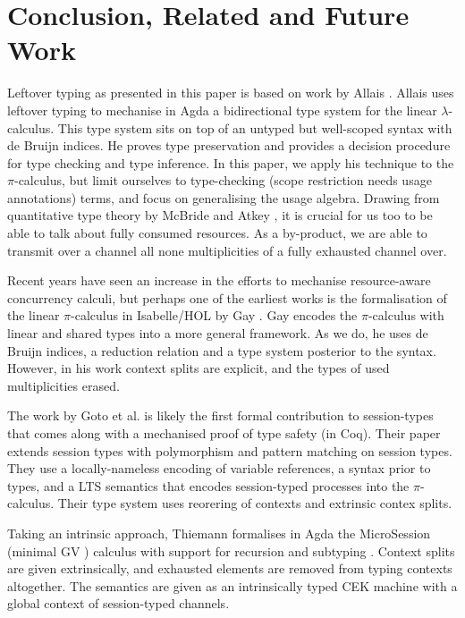 \documentclass[a4paper,UKenglish,cleveref,autoref,thm-restate,authorcolumns]{lipics-v2019}
\theoremstyle{definition}
\newcommand{\lambdacalc}{$\lambda$-calculus}
\newcommand{\picalc}{$\pi$-calculus}
\begin{document}
\section{Conclusion, Related and Future Work}

Leftover typing as presented in this paper is based on work by Allais \cite{Allais2018a}.
Allais uses leftover typing to mechanise in Agda a bidirectional type system for the linear \lambdacalc{}.
This type system sits on top of an untyped but well-scoped syntax with de Bruijn indices.
He proves type preservation and provides a decision procedure for type checking and type inference.
In this paper, we apply his technique to the \picalc{}, but limit ourselves to type-checking (scope restriction needs usage annotations) terms, and focus on generalising the usage algebra.
Drawing from quantitative type theory by McBride and Atkey \cite{McBride2016, Atkey2018}, it is crucial for us too to be able to talk about fully consumed resources.
As a by-product, we are able to transmit over a channel all none multiplicities of a fully exhausted channel over.

Recent years have seen an increase in the efforts to mechanise resource-aware concurrency calculi, but perhaps one of the earliest works is the formalisation of the linear \picalc{} in Isabelle/HOL by Gay \cite{Gay2001}.
Gay encodes the \picalc{} with linear and shared types into a more general framework.
As we do, he uses de Bruijn indices, a reduction relation and a type system posterior to the syntax.
However, in his work context splits are explicit, and the types of used multiplicities erased.

The work by Goto et al. \cite{Goto2016a} is likely the first formal contribution to session-types that comes along with a mechanised proof of type safety (in Coq). 
Their paper extends session types with polymorphism and pattern matching on session types.
They use a locally-nameless encoding of variable references, a syntax prior to types, and a LTS semantics that encodes session-typed processes into the \picalc{}.
Their type system uses reorering of contexts and extrinsic contex splits. 

Taking an intrinsic approach, Thiemann formalises in Agda the MicroSession (minimal GV \cite{}) calculus with support for recursion and subtyping \cite{Thiemann2019}.
Context splits are given extrinsically, and exhausted elements are removed from typing contexts altogether.
The semantics are given as an intrinsically typed CEK machine with a global context of session-typed channels.
\end{document}
